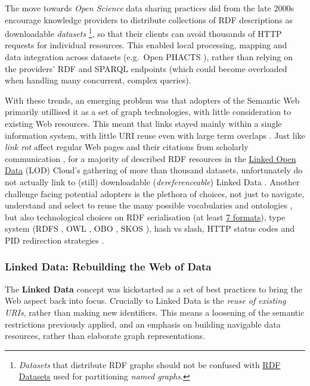 \documentclass[fleqn,10pt,NOlineno]{wlpeerjlua}
\begin{document}
The move towards \emph{Open Science} data sharing practices did from the late 2000s encourage knowledge providers to distribute collections of RDF descriptions as downloadable \emph{datasets} \footnote{\emph{Datasets} that distribute RDF graphs should not be confused with \href{https://www.w3.org/TR/rdf11-concepts/\#section-dataset}{RDF Datasets} used for partitioning \emph{named graphs}.}, so that their clients can avoid thousands of HTTP requests for individual resources. This enabled local processing, mapping and data integration across datasets (e.g.~Open PHACTS \autocite{grothAPIcentricLinkedData2014b}), rather than relying on the providers' RDF and SPARQL endpoints (which could become overloaded when handling many concurrent, complex queries).

With these trends, an emerging problem was that adopters of the Semantic Web primarily utillised it as a set of graph technologies, with little consideration to existing Web resources. This meant that links stayed mainly within a single information system, with little URI reuse even with large term overlaps \autocite{kamdarSystematicAnalysisTerm2017a}. Just like \emph{link rot} affect regular Web pages and their citations from scholarly communication \autocite{kleinScholarlyContextNot2014a}, for a majority of described RDF resources in the \href{https://lod-cloud.net/}{Linked Open Data} (LOD) Cloud's gathering of more than thousand datasets, unfortunately do not actually link to (still) downloadable (\emph{dereferenceable}) Linked Data \autocite{polleresMoreDecentralizedVision2020a}. Another challenge facing potential adopters is the plethora of choices, not just to navigate, understand and select to reuse the many possible vocabularies and ontologies \autocite{carrieroLandscapeOntologyReuse2020a}, but also technological choices on RDF serialisation (at least \href{https://www.w3.org/TR/rdf11-primer/\#section-graph-syntax}{7 formats}), type system (RDFS \autocite{w3-rdf-schema}, OWL \autocite{w3-owl2-overview}, OBO \autocite{tirmiziMappingOBOOWL2011a}, SKOS \autocite{w3-skos-primer}), hash vs slash, HTTP status codes and PID redirection strategies \autocite{sauermannCoolURIsSemantic2011}.

\subsubsection*{Linked Data: Rebuilding the Web of Data}\label{sec:ld-web}

The \textbf{Linked Data} concept \autocite{bizerLinkedDataStory2009a} was kickstarted as a set of best practices \autocite{LinkedDataDesign} to bring the Web aspect back into focus. Crucially to Linked Data is the \emph{reuse of existing URIs}, rather than making new identifiers. This means a loosening of the semantic restrictions previously applied, and an emphasis on building navigable data resources, rather than elaborate graph representations.
\end{document}
